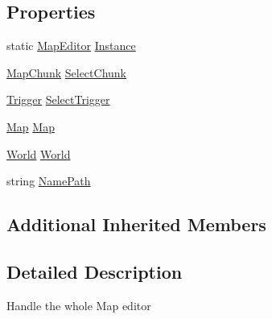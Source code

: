 \subsection*{Properties}
\begin{DoxyCompactItemize}
\item 
static \hyperlink{classgearit_1_1src_1_1editor_1_1map_1_1_map_editor}{Map\+Editor} \hyperlink{classgearit_1_1src_1_1editor_1_1map_1_1_map_editor_a0f4982ba18a475f77638276aec9dcd44}{Instance}
\item 
\hyperlink{classgearit_1_1src_1_1editor_1_1map_1_1_map_chunk}{Map\+Chunk} \hyperlink{classgearit_1_1src_1_1editor_1_1map_1_1_map_editor_a9b470c9742dff0859bf17de6ad4476b4}{Select\+Chunk}
\item 
\hyperlink{classgearit_1_1src_1_1map_1_1_trigger}{Trigger} \hyperlink{classgearit_1_1src_1_1editor_1_1map_1_1_map_editor_a1df353b14da747b5faa6fc5e9aaf71e9}{Select\+Trigger}
\item 
\hyperlink{classgearit_1_1src_1_1map_1_1_map}{Map} \hyperlink{classgearit_1_1src_1_1editor_1_1map_1_1_map_editor_a3412ce3f8ad8152b102a399a9fe8fd44}{Map}
\item 
\hyperlink{class_farseer_physics_1_1_dynamics_1_1_world}{World} \hyperlink{classgearit_1_1src_1_1editor_1_1map_1_1_map_editor_ada2c04f5469b9873b634e11ab602eadb}{World}
\item 
string \hyperlink{classgearit_1_1src_1_1editor_1_1map_1_1_map_editor_a4fdc7890db446a2709f459e55e4bb369}{Name\+Path}
\end{DoxyCompactItemize}
\subsection*{Additional Inherited Members}


\subsection{Detailed Description}
Handle the whole Map editor 



